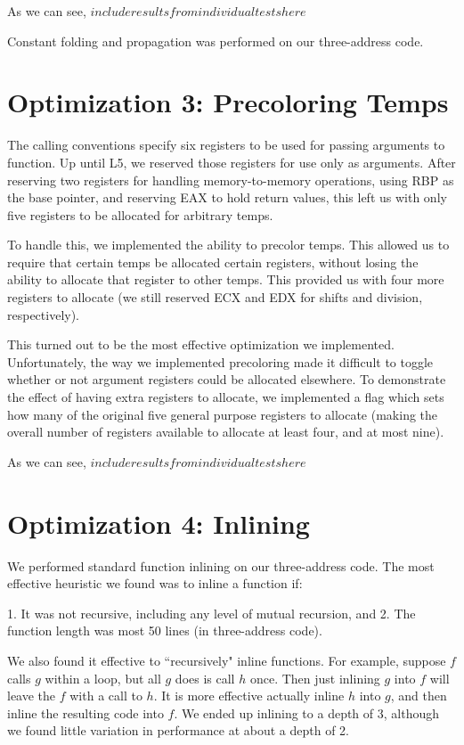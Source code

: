 \documentclass{article}
\begin{document}
As we can see, $include results from individual tests here$

Constant folding and propagation was performed on our three-address code.

\section{Optimization 3: Precoloring Temps}

The calling conventions specify six registers to be used for passing arguments to function. Up until L5, we reserved those registers for use only as arguments. After reserving two registers for handling memory-to-memory operations, using RBP as the base pointer, and reserving EAX to hold return values, this left us with only five registers to be allocated for arbitrary temps.

To handle this, we implemented the ability to precolor temps. This allowed us to require that certain temps be allocated certain registers, without losing the ability to allocate that register to other temps. This provided us with four more registers to allocate (we still reserved ECX and EDX for shifts and division, respectively). 

This turned out to be the most effective optimization we implemented. Unfortunately, the way we implemented precoloring made it difficult to toggle whether or not argument registers could be allocated elsewhere. To demonstrate the effect of having extra registers to allocate, we implemented a flag which sets how many of the original five general purpose registers to allocate (making the overall number of registers available to allocate at least four, and at most nine).

As we can see,
 $include results from individual tests here$


\section{Optimization 4: Inlining}

We performed standard function inlining on our three-address code. The most effective heuristic we found was to inline a function if:

1. It was not recursive, including any level of mutual recursion, and
2. The function length was most 50 lines (in three-address code).

We also found it effective to ``recursively" inline functions. For example, suppose $f$ calls $g$ within a loop, but all $g$ does is call $h$ once. Then just inlining $g$ into $f$ will leave the $f$ with a call to $h$. It is more effective actually inline $h$ into $g$, and then inline the resulting code into $f$. We ended up inlining to a depth of 3, although we found little variation in performance at about a depth of 2.
\end{document}
